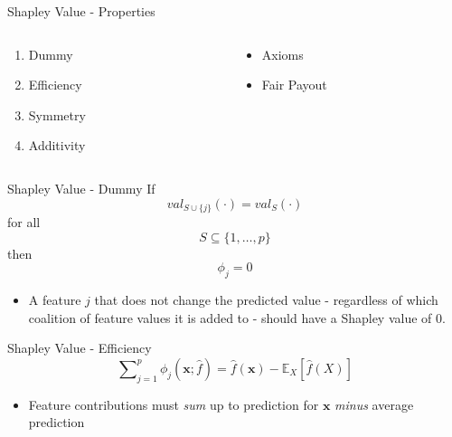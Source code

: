 \begin{frame}{Shapley Value - Properties}
	\begin{columns}
		\hspace{5em}
		\begin{column}{0.45\textwidth}
			\begin{enumerate}\setlength\itemsep{1em}
				\item Dummy
				\item Efficiency
				\item Symmetry
				\item Additivity
			\end{enumerate}
		\end{column}
		\begin{column}{0.5\textwidth}
			\begin{itemize}\setlength\itemsep{1em}
				\item Axioms
				\item Fair Payout
			\end{itemize}
		\end{column}
	\end{columns}
\end{frame}
\begin{frame}{Shapley Value - Dummy}
	If
	\begin{equation}
		val_{S\cup\{j\}}(\cdot)=val_S(\cdot)
	\end{equation}
	for all
	\begin{equation*}
		S\subseteq\{1,\ldots,p\}
	\end{equation*}
	then
	\begin{equation*}
		\phi_j=0
	\end{equation*}
	\begin{itemize}
		\item A feature $j$ that does not change the predicted value - regardless of which coalition of feature values it is added to - should have a Shapley value of 0.
	\end{itemize}
\end{frame}
\begin{frame}{Shapley Value - Efficiency}
	\begin{equation}
		\sum\nolimits_{j=1}^p\phi_j\left(\bm{x};\hat{f}\right)=\hat{f}(\bm{x})-\mathbb{E}_X\left[\hat{f}(X)\right]
	\end{equation}
	\begin{itemize}
		\item Feature contributions must \emph{sum} up to prediction for $\bm{x}$ \emph{minus} average prediction
	\end{itemize}
\end{frame}
